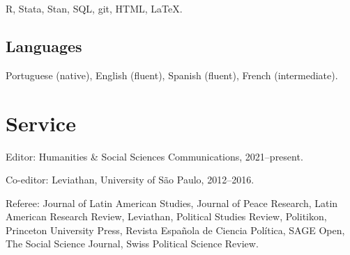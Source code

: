 \documentclass[a4paper]{article}
\renewenvironment{itemize}{
	\begin{list}{}{
			\setlength{\leftmargin}{1.5em}
		}
		}{
	\end{list}
}
\begin{document}
\begin{itemize}
\item R, Stata, Stan, SQL, git, HTML, \LaTeX{}.
\end{itemize}

\subsection*{Languages}

\begin{itemize}
\item Portuguese (native), English (fluent), Spanish (fluent), French (intermediate).
\end{itemize}



\section*{Service}

\begin{itemize}
\item Editor: Humanities \& Social Sciences Communications, 2021--present.
\item Co-editor: Leviathan, University of São Paulo, 2012--2016.
\item Referee: Journal of Latin American Studies, Journal of Peace Research, Latin American Research Review, Leviathan, Political Studies Review, Politikon, Princeton University Press, Revista Española de Ciencia Política, SAGE Open, The Social Science Journal, Swiss Political Science Review.
\end{itemize} 
\end{document}
